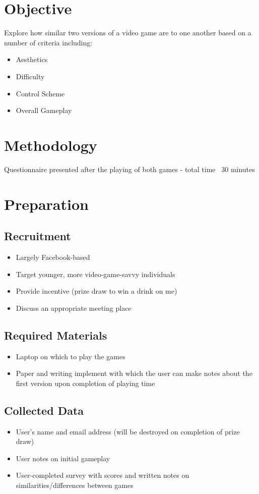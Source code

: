 \documentclass[12pt, a4paper]{report}
\begin{document}
\section{Objective}
Explore how similar two versions of a video game are to one another based on a number of criteria including:
\begin{itemize}
  \item Aesthetics
  \item Difficulty
  \item Control Scheme
  \item Overall Gameplay
\end{itemize}

\section{Methodology}
Questionnaire presented after the playing of both games - total time ~30 minutes

\section{Preparation}

\subsection{Recruitment}
\begin{itemize}
  \item Largely Facebook-based
  \item Target younger, more video-game-savvy individuals
  \item Provide incentive (prize draw to win a drink on me)
  \item Discuss an appropriate meeting place
\end{itemize}

\subsection{Required Materials}
\begin{itemize}
  \item Laptop on which to play the games
  \item Paper and writing implement with which the user can make notes about the first version upon completion of playing time
\end{itemize}

\subsection{Collected Data}
\begin{itemize}
  \item User's name and email address (will be destroyed on completion of prize draw)
  \item User notes on initial gameplay
  \item User-completed survey with scores and written notes on similarities/differences between games
\end{itemize}
\end{document}
